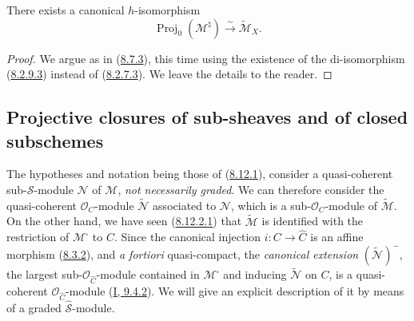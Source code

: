 \begin{proposition}[8.12.10]
\label{II.8.12.10}
There exists a canonical $h$-isomorphism
\begin{equation}
\label{II.8.12.10.1}
  \operatorname{Proj}_0(\mathcal{M}^{\natural})
  \xrightarrow{\sim}\widetilde{\mathcal{M}}_X.
\tag{8.12.10.1}
\end{equation}
\end{proposition}

\begin{proof}
We argue as in (\hyperref[II.8.7.3]{8.7.3}), this time using the
existence of the di-isomorphism (\hyperref[II.8.2.9.3]{8.2.9.3}) instead
of (\hyperref[II.8.2.7.3]{8.2.7.3}). We leave the details to the
reader.
\end{proof}

\subsection{Projective closures of sub-sheaves and of closed
subschemes}
\label{subsection:II.8.13}

\begin{env}[8.13.1]
\label{II.8.13.1}
The hypotheses and notation being those of
(\hyperref[II.8.12.1]{8.12.1}), consider a quasi-coherent
sub-$\mathcal{S}$-module $\mathcal{N}$ of $\mathcal{M}$, \emph{not
necessarily graded}. We can therefore consider the quasi-coherent
$\mathcal{O}_C$-module $\widetilde{\mathcal{N}}$ associated to $\mathcal{N}$,
which is a sub-$\mathcal{O}_C$-module of $\widetilde{\mathcal{M}}$. On the
other hand, we have seen (\hyperref[II.8.12.2.1]{8.12.2.1}) that
$\widetilde{\mathcal{M}}$ is identified with the restriction of
$\mathcal{M}^{\square}$ to $C$. Since the canonical injection
$i:C\to\widehat{C}$ is an affine morphism
(\hyperref[II.8.3.2]{8.3.2}), and \emph{a fortiori} quasi-compact, the
\emph{canonical extension} $(\widetilde{\mathcal{N}})^{-}$, the largest
sub-$\mathcal{O}_{\widehat{C}}$-module contained in
$\mathcal{M}^{\square}$ and inducing $\widetilde{\mathcal{N}}$ on $C$, is
a quasi-coherent $\mathcal{O}_{\widehat{C}}$-module
(\hyperref[I.9.4.2]{I, 9.4.2}). We will give an explicit description of
it by means of a graded $\widehat{\mathcal{S}}$-module.
\end{env}

